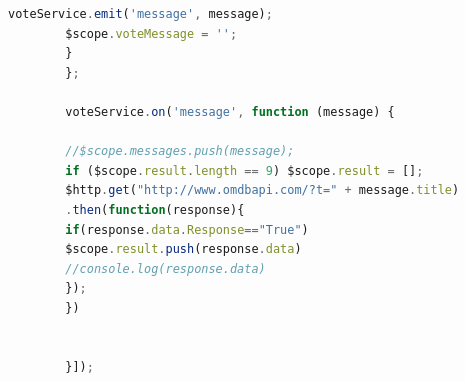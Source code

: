 \documentclass[12pt]{article}
\begin{document}
\begin{appendices}
\begin{lstlisting}[language=Javascript, caption=controllers/vote.js]
		voteService.emit('message', message);
		$scope.voteMessage = '';
		}
		};
		
		voteService.on('message', function (message) {
		
		//$scope.messages.push(message);
		if ($scope.result.length == 9) $scope.result = [];
		$http.get("http://www.omdbapi.com/?t=" + message.title)
		.then(function(response){   
		if(response.data.Response=="True")                              
		$scope.result.push(response.data)
		//console.log(response.data) 
		});
		})
		
		
		}]);
	\end{lstlisting}
\end{appendices}
\end{document}
